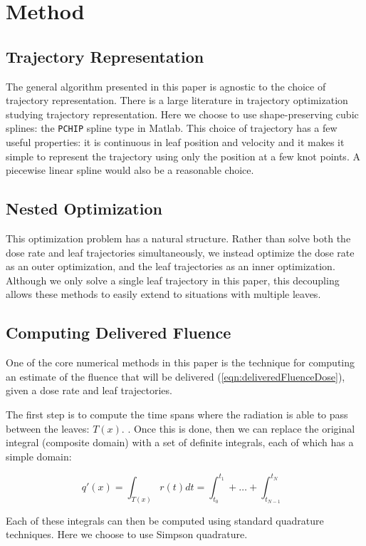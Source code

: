 \section{Method}

\subsection{Trajectory Representation}

The general algorithm presented in this paper is agnostic to the choice of trajectory representation.
There is a large literature in trajectory optimization studying trajectory representation. 
Here we choose to use shape-preserving cubic splines: the \texttt{PCHIP} spline type in Matlab.
This choice of trajectory has a few useful properties: it is continuous in leaf position and velocity
and it makes it simple to represent the trajectory using only the position at a few knot points.
A piecewise linear spline would also be a reasonable choice.


\subsection{Nested Optimization}

This optimization problem has a natural structure.
Rather than solve both the dose rate and leaf trajectories simultaneously,
we instead optimize the dose rate as an outer optimization, and the leaf trajectories as an inner optimization.
Although we only solve a single leaf trajectory in this paper, this decoupling allows these methods to easily extend to situations with multiple leaves.


\subsection{Computing Delivered Fluence}

One of the core numerical methods in this paper is the technique for computing an estimate of the fluence
that will be delivered (\ref{eqn:deliveredFluenceDose}), given a dose rate and leaf trajectories.

The first step is to compute the time spans where the radiation is able to pass between the leaves: $T(x)$.
.
Once this is done, then we can replace the original integral (composite domain) with a set of definite integrals,
each of which has a simple domain:

\begin{equation}
q'(x) = \int_{T(x)} r(t) dt = \int_{t_0}^ {t_1} + \dots + \int_{t_{N-1}}^ {t_N}
\label{eqn:deliveredFluenceDoseSum}
\end{equation}

Each of these integrals can then be computed using standard quadrature techniques.
Here we choose to use Simpson quadrature.
